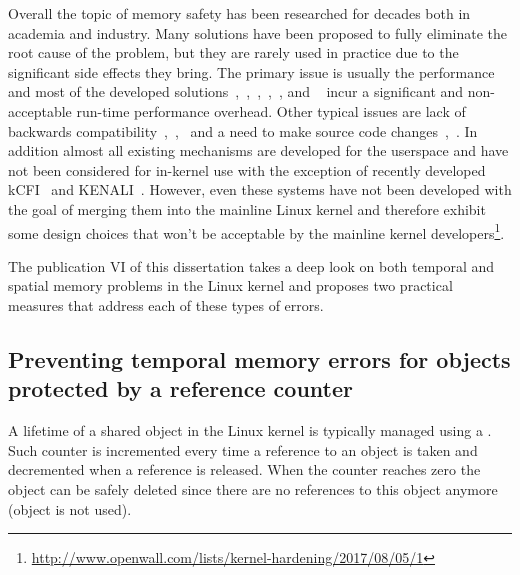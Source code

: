 Overall the topic of memory safety has been researched for decades both in academia and industry.
Many solutions have been proposed to fully eliminate the root cause of the problem, but they are rarely used in practice due to the significant side effects they bring. 
The primary issue is usually the performance and most of the developed solutions~\cite{hastings1991purify},~\cite{patil1995efficient, patil1997low},~\cite{nagarakatte2009softbound},~\cite{jones1997backwards},~\cite{yong2003protecting, xu2004efficient, nethercote2004bounds}, and ~\cite{dhurjati2006backwards} incur a significant and non-acceptable run-time performance overhead.
Other typical issues are lack of backwards compatibility~\cite{necula2002ccured},~\cite{grossman2005cyclone},~\cite{austin1994efficient} and a need to make source code changes~\cite{necula2002ccured},~\cite{grossman2005cyclone}. 
In addition almost all existing mechanisms are developed for the userspace and have not been considered for in-kernel use with the exception of recently developed kCFI~\cite{Rigo} and KENALI~\cite{kenali}. However, even these systems have not been developed with the goal of merging them into the mainline Linux kernel and therefore exhibit some design choices that won't be acceptable by the mainline kernel developers\footnote{\url{http://www.openwall.com/lists/kernel-hardening/2017/08/05/1}}. 

The publication VI of this dissertation takes a deep look on both temporal and spatial memory problems in the Linux kernel and proposes two practical measures that address each of these types of errors. 

\subsection{Preventing temporal memory errors for objects protected by a reference counter}
\label{sec:kern-mem-ref-count}

A lifetime of a shared object in the Linux kernel is typically managed using a . 
Such counter is incremented every time a reference to an object is taken and decremented when a reference is released. 
When the counter reaches zero the object can be safely deleted since there are no references to this object anymore (object is not used).

